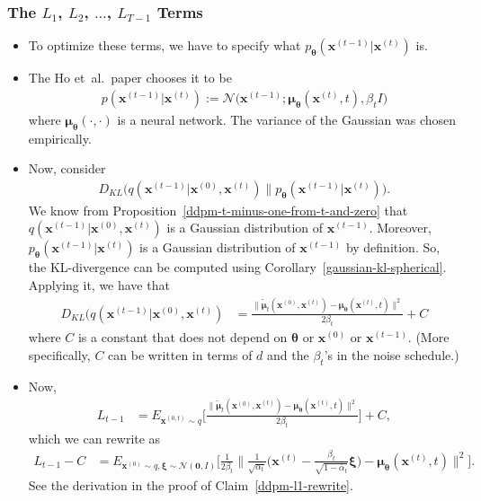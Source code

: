 \documentclass[10pt]{article}
\newcommand{\ve}[1]{\mathbf{#1}}
\newcommand{\ves}[1]{\boldsymbol{#1}}
\newcommand{\etal}{{et~al.}}
\newcommand{\mcal}[1]{\mathcal{#1}}
\begin{document}
\subsubsection{The $L_1$, $L_2$, $\dotsc$, $L_{T-1}$ Terms}

\begin{itemize}
\item To optimize these terms, we have to specify what $p_{\ves{\theta}}(\ve{x}^{(t-1)}|\ve{x}^{(t)})$ is.

\item The Ho \etal\ paper chooses it to be
\begin{align*}
  p(\ve{x}^{(t-1)}|\ve{x}^{(t)}) := \mathcal{N}\big( \ve{x}^{(t-1)}; \ves{\mu}_{\ves{\theta}}(\ve{x}^{(t)},t ), \beta_t I \big)
\end{align*}
where $\ves{\mu}_{\ves{\theta}}(\cdot, \cdot)$ is a neural network. The variance of the Gaussian was chosen empirically.

\item Now, consider
\begin{align*}
  D_{KL}\big( q(\ve{x}^{(t-1)}|\ve{x}^{(0)},\ve{x}^{(t)})  \big\| p_{\ves{\theta}}(\ve{x}^{(t-1)}|\ve{x}^{(t)}) \big).
\end{align*}
We know from Proposition~\ref{ddpm-t-minus-one-from-t-and-zero} that $q(\ve{x}^{(t-1)}|\ve{x}^{(0)},\ve{x}^{(t)})$ is a Gaussian distribution of $\ve{x}^{(t-1)}$. Moreover, $p_{\ves{\theta}}(\ve{x}^{(t-1)}|\ve{x}^{(t)})$ is a Gaussian distribution of $\ve{x}^{(t-1)}$ by definition. So, the KL-divergence can be computed using Corollary~\ref{gaussian-kl-spherical}. Applying it, we have that
\begin{align}
  D_{KL}\big( q(\ve{x}^{(t-1)}|\ve{x}^{(0)},\ve{x}^{(t)})
  &= \frac{\| \tilde{\ves{\mu}}_t(\ve{x}^{(0)},\ve{x}^{(t)}) - \ves{\mu}_{\ves{\theta}}(\ve{x}^{(t)}, t) \|^2}{2 \beta_t} + C \label{ddpm-l1-kl-divergence}
\end{align}
where $C$ is a constant that does not depend on $\ves{\theta}$ or $\ve{x}^{(0)}$ or $\ve{x}^{(t-1)}$. (More specifically, $C$ can be written in terms of $d$ and the $\beta_t$'s in the noise schedule.)

\item Now,
\begin{align*}
  L_{t-1} 
  &= E_{\ve{x}^{(0,t)} \sim q} \bigg[ \frac{\| \tilde{\ves{\mu}}_t(\ve{x}^{(0)},\ve{x}^{(t)}) - \ves{\mu}_{\ves{\theta}}(\ve{x}^{(t)}, t) \|^2}{2 \beta_t} \bigg] + C,
\end{align*}
which we can rewrite as
\begin{align*}
  L_{t-1} - C &= E_{\ve{x}^{(0)} \sim q, \ves{\xi} \sim \mcal{N}(\ve{0}, I)} \bigg[\frac{1}{2\beta_t} \bigg\| 
  \frac{1}{\sqrt{\alpha_t}} \bigg( \ve{x}^{(t)} - \frac{\beta_t}{\sqrt{1 - \overline{\alpha}_t}} \ves{\xi} \bigg)
    - \ves{\mu}_{\ves{\theta}}(\ve{x}^{(t)}, t) 
  \bigg\|^2 \bigg].
\end{align*}
See the derivation in the proof of Claim~\ref{ddpm-l1-rewrite}.


\end{itemize}
\end{document}
